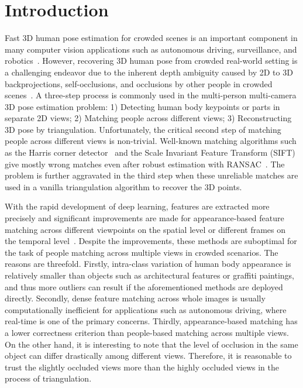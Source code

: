 \documentclass[runningheads]{llncs}
\begin{document}
\section{Introduction}
Fast 3D human pose estimation for crowded scenes is an important component in many computer vision applications such as autonomous driving, surveillance, and robotics~\cite{dinesh2018carfusion,fernando2018tracking,kubo2019programmable,li2018carn,li2020group,li20193d,stoll2011fast,vo2020self,xin2019theory}. However, recovering 3D human pose from crowded real-world setting is a challenging endeavor due to the inherent depth ambiguity caused by 2D to 3D backprojections, self-occlusions, and occlusions by other people in crowded scenes~\cite{baque2017deep,korman2018oatm,reddy2019occlusion}. A three-step process is commonly used in the multi-person multi-camera 3D pose estimation problem: 1) Detecting human body keypoints or parts in separate 2D views;  2) Matching people across different views; 3) Reconstructing 3D pose by triangulation. Unfortunately, the critical second step of matching people across different views is non-trivial. Well-known matching algorithms such as the Harris corner detector~\cite{harris1988combined} and the Scale Invariant Feature Transform (SIFT)~\cite{lowe1999object} give mostly wrong matches even after robust estimation with RANSAC~\cite{fischler1981random}. The problem is further aggravated in the third step when these unreliable matches are used in a vanilla triangulation algorithm to recover the 3D points.    

With the rapid development of deep learning, features are extracted more precisely and significant improvements are made for appearance-based feature matching across different viewpoints on the spatial level or different frames on the temporal level~\cite{liu2020extremely,sindagi2019multi,yew20183dfeat}. Despite the improvements, these methods are suboptimal for the task of people matching across multiple views in crowded scenarios. The reasons are threefold. Firstly, intra-class variation of human body appearance is relatively smaller than objects such as architectural features or graffiti paintings, and thus more outliers can result if the aforementioned methods are deployed directly. Secondly, dense feature matching across whole images is usually computationally inefficient for applications such as autonomous driving, where real-time is one of the primary concerns. Thirdly, appearance-based matching has a lower correctness criterion than people-based matching across multiple views. On the other hand, it is interesting to note that the level of occlusion in the same object can differ drastically among different views. Therefore, it is reasonable to trust the slightly occluded views more than the highly occluded views in the process of triangulation.
\end{document}
